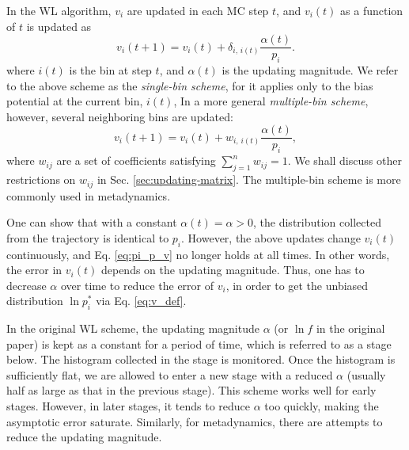 \documentclass[reprint]{revtex4-1}
\begin{document}
In the WL algorithm\cite{wang2001, wang2001pre},
$v_i$ are updated
in each MC step $t$,
and $v_i(t)$ as a function of $t$
is updated as
%
\begin{equation}
  v_i(t+1)
  =
  v_i(t)
  +
  \delta_{i, \, i(t)}
  \frac{ \alpha(t) } { p_i }.
  \label{eq:wl_update}
\end{equation}
%
where $i(t)$ is the bin at step $t$,
and $\alpha(t)$ is the updating magnitude.
%
We refer to the above scheme as the \emph{single-bin scheme},
for it applies only to the bias potential
at the current bin, $i(t)$,
%
In a more general \emph{multiple-bin scheme}, however,
several neighboring bins are updated:
%
\begin{equation}
  v_i(t+1)
  =
  v_i(t)
  +
  w_{i, \, i(t)}
  \frac{ \alpha(t) } { p_i },
  \label{eq:mbin_update}
\end{equation}
%
where $w_{ij}$ are a set of coefficients satisfying
$\sum_{j=1}^n w_{ij} = 1$.
%
We shall discuss other restrictions on $w_{ij}$
in Sec. \ref{sec:updating-matrix}.
%
The multiple-bin scheme is more commonly
used in metadynamics.



One can show that with a constant $\alpha(t) = \alpha > 0$,
the distribution collected from
the trajectory is identical to $p_i$.
%
However, the above updates
change $v_i(t)$ continuously,
and Eq. \eqref{eq:pi_p_v} no longer holds
at all times.
%
In other words,
the error in $v_i(t)$
depends on the updating magnitude\cite{
  zhou2005, liang2005, bussi2006, liang2007,
  morozov2007, zhou2008, morozov2009, crespo2010,
  atchade2011, fort2015}.
%
Thus, one has to decrease $\alpha$ over time
to reduce the error of $v_i$,
in order to get the unbiased distribution
$\ln p_i^*$ via Eq. \eqref{eq:v_def}.





In the original WL scheme,
the updating magnitude $\alpha$ (or $\ln f$
in the original paper) is kept as a constant
for a period of time,
which is referred to as a stage below.
%
The histogram collected in the stage is monitored.
%
Once the histogram is sufficiently flat,
we are allowed to enter a new stage
with a reduced $\alpha$\cite{wang2001, wang2001pre}
(usually half as large as
that in the previous stage).
%
This scheme works well for early stages.
%
However, in later stages, it tends to reduce $\alpha$
too quickly, making the asymptotic error
saturate\cite{belardinelli2007, belardinelli2007jcp, belardinelli2008}.
%
Similarly, for metadynamics,
there are attempts to reduce the updating magnitude\cite{
  barducci2008, dickson2011, dama2014, dickson2015}.
\end{document}
